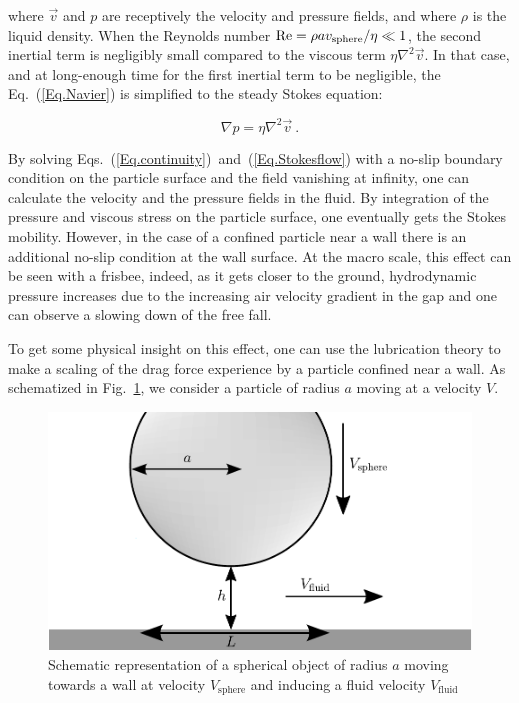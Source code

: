 where $\vec{v}$ and $p$ are receptively the velocity and pressure fields, and where $\rho$ is the liquid density. When the Reynolds number $\textnormal{Re} = \rho a v_\mathrm{sphere} / \eta \ll 1$,  the second inertial term is negligibly small compared to the viscous term $\eta \nabla ^2 \vec{v}$. In that case, and at long-enough time for the first inertial term to be negligible, the Eq.~(\ref{Eq.Navier}) is simplified to the steady Stokes equation:

\begin{equation}
	\nabla p = \eta \nabla ^2 \vec{v}~.
	\label{Eq.Stokesflow}
\end{equation}

By solving Eqs.~(\ref{Eq.continuity})~and~(\ref{Eq.Stokesflow}) with a no-slip boundary condition on the particle surface and the field vanishing at infinity, one can calculate the velocity and the pressure fields in the fluid. By integration of the pressure and viscous stress on the particle surface, one eventually gets the Stokes mobility. However, in the case of a confined particle near a wall there is an additional no-slip condition at the wall surface. At the macro scale, this effect can be seen with a frisbee, indeed, as it gets closer to the ground, hydrodynamic pressure increases due to the increasing air velocity gradient in the gap and one can observe a slowing down of the free fall.

To get some physical insight on this effect, one can use the lubrication theory to make a scaling of the drag force experience by a particle confined near a wall. As schematized in Fig.~\ref{fig.shear}, we consider a particle of radius $a$ moving at a velocity $V$. 

\begin{figure}[ht]
	\centering
	\includegraphics{02_body/chapter3/images/draw_shear/shear.pdf}
	\caption{Schematic representation of a spherical object of radius $a$ moving towards a wall at velocity $V_\mathrm{sphere}$ and inducing a fluid velocity $V_\mathrm{fluid}$} 
	\label{fig.shear}
\end{figure}

